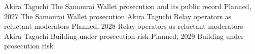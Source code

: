   {Akira Taguchi}
  {The Samourai Wallet prosecution and its public record}
  {Planned, 2027}
  {The Samourai Wallet prosecution}
  {Akira Taguchi}
  {Relay operators as reluctant moderators}
  {Planned, 2028}
  {Relay operators as reluctant moderators}
  {Akira Taguchi}
  {Building under prosecution risk}
  {Planned, 2029}
  {Building under prosecution risk}
